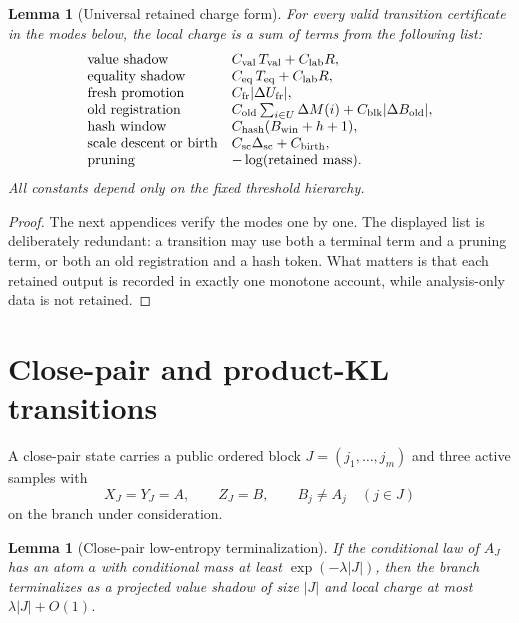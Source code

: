 \documentclass[11pt]{article}
\newtheorem{lemma}[theorem]{Lemma}
\theoremstyle{remark}
\newcommand{\old}{\mathrm{old}}
\newcommand{\fr}{\mathrm{fr}}
\newcommand{\scal}{\mathrm{sc}}
\begin{document}
\begin{lemma}[Universal retained charge form]\label{lem:universal-charge}
For every valid transition certificate in the modes below, the local charge is a sum of terms from the following list:
\[
\begin{array}{ll}
\hbox{value shadow} & C_{\rm val}\,T_{\rm val}+C_{\rm lab}R,\\
\hbox{equality shadow} & C_{\rm eq}\,T_{\rm eq}+C_{\rm lab}R,\\
\hbox{fresh promotion} & C_{\fr}|\Delta U_{\fr}|,\\
\hbox{old registration} & C_{\old}\sum_{i\in U}\Delta M(i)+C_{\rm blk}|\Delta B_{\old}|,\\
\hbox{hash window} & C_{\rm hash}(B_{\rm win}+h+1),\\
\hbox{scale descent or birth} & C_{\scal}\Delta_{\scal}+C_{\rm birth},\\
\hbox{pruning} & -\log(\hbox{retained mass}).
\end{array}
\]
All constants depend only on the fixed threshold hierarchy.
\end{lemma}

\begin{proof}
The next appendices verify the modes one by one.  The displayed list is deliberately redundant: a transition may use both a terminal term and a pruning term, or both an old registration and a hash token.  What matters is that each retained output is recorded in exactly one monotone account, while analysis-only data is not retained.
\end{proof}

\section{Close-pair and product-KL transitions}\label{app:close-product}

A close-pair state carries a public ordered block $J=(j_1,\ldots,j_m)$ and three active samples with
\[
        X_J=Y_J=A,
        \qquad Z_J=B,
        \qquad B_j\ne A_j\quad (j\in J)
\]
on the branch under consideration.

\begin{lemma}[Close-pair low-entropy terminalization]\label{lem:app-low-entropy}
If the conditional law of $A_J$ has an atom $a$ with conditional mass at least $\exp(-\lambda |J|)$, then the branch terminalizes as a projected value shadow of size $|J|$ and local charge at most $\lambda |J|+O(1)$.
\end{lemma}
\end{document}

